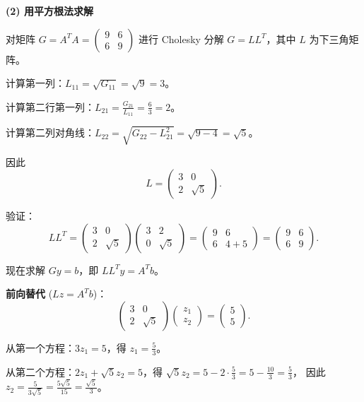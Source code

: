 \documentclass{article}
\begin{document}
\begin{solution}
  \textbf{(2) 用平方根法求解}

  对矩阵 $G = A^T A =
  \begin{pmatrix} 9 & 6 \\ 6 & 9
  \end{pmatrix}$ 进行 Cholesky 分解 $G = LL^T$，其中 $L$ 为下三角矩阵。

  计算第一列：$L_{11} = \sqrt{G_{11}} = \sqrt{9} = 3$。

  计算第二行第一列：$L_{21} = \frac{G_{21}}{L_{11}} = \frac{6}{3} = 2$。

  计算第二列对角线：$L_{22} = \sqrt{G_{22} - L_{21}^2} = \sqrt{9 - 4} = \sqrt{5}$。

  因此
  \[
    L =
    \begin{pmatrix} 3 & 0 \\ 2 & \sqrt{5}
    \end{pmatrix}.
  \]

  验证：
  \[
    LL^T =
    \begin{pmatrix} 3 & 0 \\ 2 & \sqrt{5}
    \end{pmatrix}
    \begin{pmatrix} 3 & 2 \\ 0 & \sqrt{5}
    \end{pmatrix}
    =
    \begin{pmatrix} 9 & 6 \\ 6 & 4+5
    \end{pmatrix} =
    \begin{pmatrix} 9 & 6 \\ 6 & 9
    \end{pmatrix}.
  \]

  现在求解 $Gy = b$，即 $LL^T y = A^T b$。

  \textbf{前向替代} ($Lz = A^T b$)：
  \[
    \begin{pmatrix} 3 & 0 \\ 2 & \sqrt{5}
    \end{pmatrix}
    \begin{pmatrix} z_1 \\ z_2
    \end{pmatrix}
    =
    \begin{pmatrix} 5 \\ 5
    \end{pmatrix}.
  \]

  从第一个方程：$3z_1 = 5$，得 $z_1 = \frac{5}{3}$。

  从第二个方程：$2z_1 + \sqrt{5}z_2 = 5$，得 $\sqrt{5}z_2 = 5 - 2 \cdot
  \frac{5}{3} = 5 - \frac{10}{3} = \frac{5}{3}$，
  因此 $z_2 = \frac{5}{3\sqrt{5}} = \frac{5\sqrt{5}}{15} = \frac{\sqrt{5}}{3}$。


\end{solution}
\end{document}
